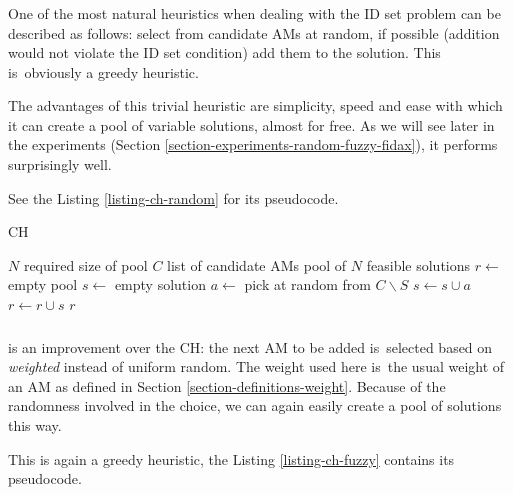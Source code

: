 \subsubsection{}
\label{heu-ch-random}

One of the most natural heuristics when dealing with the ID set problem can be described as follows: select from candidate AMs at random, if possible (addition would not violate the ID set condition) add them to the solution. This is~obviously a greedy heuristic.

The advantages of this trivial heuristic are simplicity, speed and ease with which it can create a pool of variable solutions, almost for free. As we will see later in the experiments (Section \ref{section-experiments-random-fuzzy-fidax}), it performs surprisingly well.

See the Listing \ref{listing-ch-random} for its pseudocode.

\begin{algorithm}
\caption{ CH}
\label{listing-ch-random}
\begin{algorithmic}
\REQUIRE $N$ required size of pool
\REQUIRE $C$ list of candidate AMs
\ENSURE pool of $N$ feasible solutions
\STATE $r \gets $ empty pool
  \STATE {}
  \STATE $s \gets $ empty solution
    \STATE $a \gets $ pick at random from $C \backslash S$
    \STATE $s \gets s \cup a$
  \ENDWHILE
  \STATE $r \gets r \cup s$
\ENDFOR
\RETURN $r$
\end{algorithmic}
\end{algorithm}

\subsubsection{}
\label{heu-ch-fuzzy}

 is an improvement over the  CH: the next AM to be added is~selected based on \textit{weighted} instead of uniform random. The weight used here is~the usual weight of an AM as defined in Section \ref{section-definitions-weight}. Because of the randomness involved in the choice, we can again easily create a pool of solutions this way.

This is again a greedy heuristic, the Listing \ref{listing-ch-fuzzy} contains its pseudocode.


